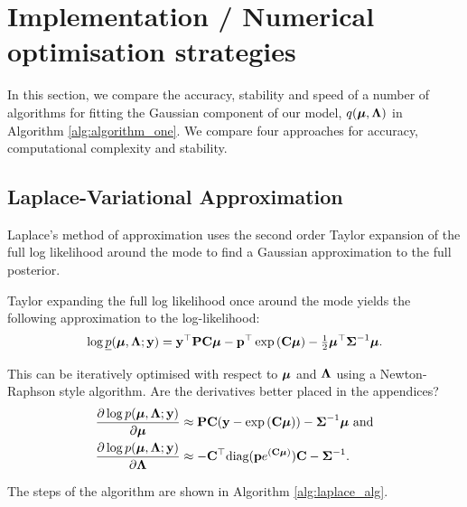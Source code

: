 \documentclass{amsart}[12pt]
\newcommand{\mgc}[1]{{\color{blue}#1}}
\begin{document}
	\section{Implementation / Numerical optimisation strategies}
	\label{sec:algorithms}
		
	In this section, we compare the accuracy, stability and speed of a number of algorithms for fitting the
	Gaussian component of our model, $q({\boldsymbol \mu}, {\boldsymbol \Lambda})$ in Algorithm \ref{alg:algorithm_one}.  We compare four
	approaches for accuracy, computational complexity and stability.
	
	\subsection{Laplace-Variational Approximation}
		
	Laplace's method of approximation uses the second order Taylor expansion of the full log likelihood around
	the mode to find a Gaussian approximation to the full posterior.
	
		
		
	\noindent Taylor expanding the full log likelihood once around the mode yields the following approximation to 
	the	log-likelihood:
	\begin{align*}
		\log \underline{p}({\boldsymbol \mu}, {\boldsymbol \Lambda}; {\bf y}) = {\bf y}^\top{\bf P}{\bf C}{\boldsymbol\mu} - {\bf p}^\top\exp \left ({\bf C} {\boldsymbol \mu} \right ) - \tfrac{1}{2} {\boldsymbol \mu}^\top {\boldsymbol\Sigma}^{-1} {\boldsymbol \mu}. 
	\end{align*}
		
	\noindent This can be iteratively optimised with respect to ${\boldsymbol \mu}$ and ${\boldsymbol \Lambda}$ using a Newton-Raphson style
	algorithm.
	\mgc{Are the derivatives better placed in the appendices?}
	\begin{align*}
		\frac{\partial \log p({\boldsymbol \mu}, {\boldsymbol \Lambda}; {\bf y})}{\partial {\boldsymbol\mu}}     & \approx {\bf P} {\bf C} ({\bf y} - \exp{({\bf C}{\boldsymbol\mu})}) - {\boldsymbol \Sigma}^{-1} {\boldsymbol \mu} \text{ and} \\
		\frac{\partial \log p({\boldsymbol \mu}, {\boldsymbol \Lambda}; {\bf y})}{\partial {\boldsymbol\Lambda}} & \approx - {\bf C}^\top \text{diag}({\bf p} e^{({\bf C} {\boldsymbol \mu})}) {\bf C} - {\boldsymbol \Sigma}^{-1}.   
	\end{align*}
		
	\noindent The steps of the algorithm are shown in Algorithm \ref{alg:laplace_alg}.
		
\end{document}
